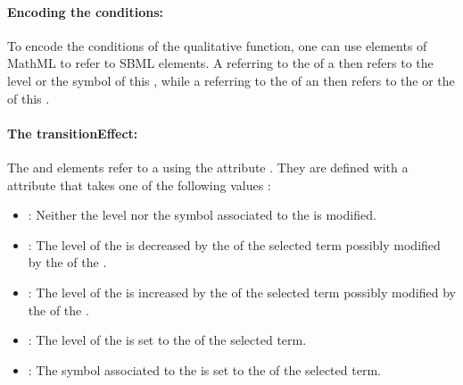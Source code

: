 \paragraph{Encoding the conditions:}
To encode the conditions of the qualitative function, one can use  elements of MathML to refer to SBML elements. A  referring to the  of a  then refers to the level or the symbol of this , while a  referring to the  of an  then refers to the  or the  of this .


\paragraph{The transitionEffect:}
The  and  elements refer to a  using the attribute . They are defined with a  attribute that takes one of the following values :
\begin{itemize}
	\item {}: Neither the level nor the symbol associated to the  is modified.
	\item {}: The level of the  is decreased by the  of the selected term possibly modified by the  of the .
	\item {}: The level of the  is increased by the  of the selected term possibly modified by the  of the .
	\item {}: The level of the  is set to the  of the selected term.
	\item {}: The symbol associated to the  is set to the  of the selected term.
\end{itemize}


